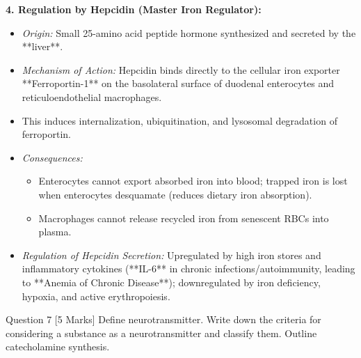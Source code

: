 \documentclass[11pt,a4paper]{article}
\begin{document}
\begin{ansbox}
\textbf{4. Regulation by Hepcidin (Master Iron Regulator):}
\begin{itemize}[leftmargin=*]
    \item \textit{Origin:} Small 25-amino acid peptide hormone synthesized and secreted by the **liver**.
    \item \textit{Mechanism of Action:} Hepcidin binds directly to the cellular iron exporter **Ferroportin-1** on the basolateral surface of duodenal enterocytes and reticuloendothelial macrophages.
    \item This induces internalization, ubiquitination, and lysosomal degradation of ferroportin.
    \item \textit{Consequences:}
    \begin{itemize}
        \item Enterocytes cannot export absorbed iron into blood; trapped iron is lost when enterocytes desquamate (reduces dietary iron absorption).
        \item Macrophages cannot release recycled iron from senescent RBCs into plasma.
    \end{itemize}
    \item \textit{Regulation of Hepcidin Secretion:} Upregulated by high iron stores and inflammatory cytokines (**IL-6** in chronic infections/autoimmunity, leading to **Anemia of Chronic Disease**); downregulated by iron deficiency, hypoxia, and active erythropoiesis.
\end{itemize}
\end{ansbox}

\begin{qbox}{Question 7 [5 Marks]}
Define neurotransmitter. Write down the criteria for considering a substance as a neurotransmitter and classify them. Outline catecholamine synthesis.
\end{qbox}
\end{document}
